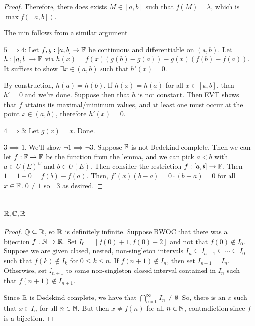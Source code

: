 \documentclass{report}
\begin{document}
\begin{proof}
    Therefore, there does exists $M \in [a,b]$ such that $f(M) = \lambda$, which is $\max f([a,b])$. 

    The min follows from a similar argument. 

    $5 \implies 4$: Let $f, g: [a,b] \to \FF$ be continuous and differentiable on $(a, b)$. Let $h:[a,b]\to \FF$ via $h(x) = f(x)(g(b) - g(a)) - g(x)(f(b) - f(a))$. It suffices to show $\exists x \in (a, b)$ such that $h'(x) = 0$.

    By construction, $h(a) = h(b)$. If $h(x) = h(a)$ for all $x \in [a,b]$, then $h' = 0$ and we're done. Suppose then that $h$ is not constant. Then EVT shows that $f$ attains its maximal/minimum values, and at least one must occur at the point $x \in (a, b)$, therefore $h'(x) = 0$.

    $4 \implies 3$: Let $g(x) = x$. Done.

    $3 \implies 1$. We'll show $\neg 1 \implies \neg 3$. Suppose $\FF$ is not Dedekind complete. Then we can let $f: \FF \to \FF$ be the function from the lemma, and we can pick $a < b$ with $a \in U(E)^C$ and $b \in U(E)$. Then consider the restriction $f:[a,b] \to \FF$. Then $1 = 1 - 0 = f(b) - f(a)$. Then, $f'(x) (b-a) = 0 \cdot(b-a) = 0$ for all $x \in \FF$. $0 \neq 1$ so $\neg 3$ as desired.
\end{proof}

\chapter{$\RR, \CC, \bar \RR$}
\begin{proof}
    $\QQ \subseteq \RR$, so $\RR$ is definitely infinite. Suppose BWOC that there was a bijection $f: \NN \to \RR$. Set $I_0 = [f(0) + 1, f(0) + 2]$ and not that $f(0) \notin I_0$. Suppose we are given closed, nested, non-singleton intervals $I_n \subseteq I_{n-1} \subseteq \cdots \subseteq I_0$ such that $f(k) \notin I_k$ for $0 \leq k \leq n$. If $f(n+1) \notin I_n$, then set $I_{n+1} = I_n$. Otherwise, set $I_{n+1}$ to some non-singleton closed interval contained in $I_n$ such that $f(n+1) \notin I_{n+1}$.

    Since $\RR$ is Dedekind complete, we have that $\bigcap_{n=0}^\infty I_n \neq \emptyset$. So, there is an $x$ such that $x \in I_n$ for all $n \in \NN$. But then $x \neq f(n)$ for all $n \in \NN$, contradiction since $f$ is a bijection.
\end{proof}
\end{document}

